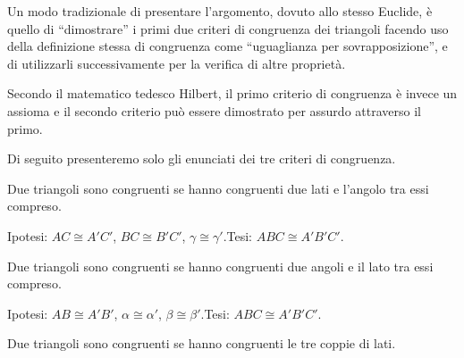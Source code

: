 Un modo tradizionale di presentare l'argomento, dovuto allo stesso 
Euclide, è quello di ``dimostrare'' i primi due criteri di congruenza 
dei triangoli facendo uso della definizione stessa di congruenza come 
``uguaglianza per sovrapposizione'', e di utilizzarli successivamente 
per la verifica di altre proprietà.

Secondo il matematico tedesco Hilbert, il primo criterio di 
congruenza è invece un assioma e il secondo criterio può essere 
dimostrato per assurdo attraverso il primo. 

Di seguito presenteremo solo gli enunciati dei tre criteri di congruenza.

\begin{teorema}
Due triangoli sono congruenti se hanno congruenti due lati e l'angolo 
tra essi compreso.
\end{teorema}


\begin{inaccessibleblock}
 \begin{figure}[htb]
\centering
\end{figure}
\end{inaccessibleblock}

\noindent Ipotesi: $AC\cong A'C'$, $BC\cong B'C'$, $\gamma \cong 
\gamma'$.\tab Tesi:  $ABC \cong A'B'C'$.

\begin{teorema}
Due triangoli sono congruenti se hanno congruenti due angoli e il 
lato tra essi compreso.
\end{teorema}


\begin{inaccessibleblock}
 \begin{figure}[htb]
\centering
\end{figure}
\end{inaccessibleblock}

\noindent Ipotesi: $AB\cong A'B'$, $\alpha\cong \alpha'$, $\beta 
\cong \beta'$.\tab Tesi:  $ABC \cong A'B'C'$.

\begin{teorema}
  Due triangoli sono congruenti se hanno congruenti le tre coppie di 
  lati.
\end{teorema}



